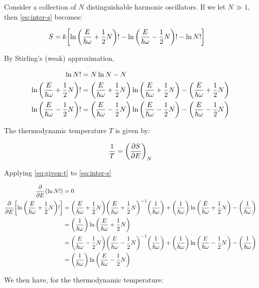 \documentclass[12pt,a4paper]{article}
\begin{document}
Consider a collection of $N$ distinguishable harmonic oscillators. If we let $N \gg 1$, then \eqref{eq:inter-s} becomes:

\begin{align}
	S &= k\qty[\ln\qty(\frac{E}{\hbar\omega} + \frac{1}{2}N)!-\ln\qty(\frac{E}{\hbar\omega} - \frac{1}{2}N)! - \ln N!]
\end{align}

By Stirling's (weak) approximation,

\begin{align}
    \ln N! &= N\ln N - N\\
    \ln\qty(\frac{E}{\hbar\omega} + \frac{1}{2}N)! &= \qty(\frac{E}{\hbar\omega} + \frac{1}{2}N)\ln\qty(\frac{E}{\hbar\omega} + \frac{1}{2}N) - \qty(\frac{E}{\hbar\omega} + \frac{1}{2}N) \\
    \ln\qty(\frac{E}{\hbar\omega} - \frac{1}{2}N)! &= \qty(\frac{E}{\hbar\omega} - \frac{1}{2}N)\ln\qty(\frac{E}{\hbar\omega} - \frac{1}{2}N) - \qty(\frac{E}{\hbar\omega} - \frac{1}{2}N)
\end{align}

The thermodynamic temperature $T$ is given by:

\begin{equation}
    \frac{1}{T} = \qty(\pdv{S}{E})_{N} \label{eq:given-t}
\end{equation}

Applying \eqref{eq:given-t} to \eqref{eq:inter-s}

\begin{align}
    \pdv{E}(\ln N!) &= 0 \\
    \pdv{E}\qty[\ln\qty(\frac{E}{\hbar\omega} + \frac{1}{2}N)!] &= \qty(\frac{E}{\hbar\omega} + \frac{1}{2}N)\qty(\frac{E}{\hbar\omega} + \frac{1}{2}N)^{-1}\qty(\frac{1}{\hbar\omega})+ \qty(\frac{1}{\hbar\omega})\ln\qty(\frac{E}{\hbar\omega} + \frac{1}{2}N)-\qty(\frac{1}{\hbar\omega}) \\
    &=  \qty(\frac{1}{\hbar\omega})\ln\qty(\frac{E}{\hbar\omega} + \frac{1}{2}N) \\
    &= \qty(\frac{E}{\hbar\omega} - \frac{1}{2}N)\qty(\frac{E}{\hbar\omega} - \frac{1}{2}N)^{-1}\qty(\frac{1}{\hbar\omega})+ \qty(\frac{1}{\hbar\omega})\ln\qty(\frac{E}{\hbar\omega} - \frac{1}{2}N)-\qty(\frac{1}{\hbar\omega}) \\
    &=  \qty(\frac{1}{\hbar\omega})\ln\qty(\frac{E}{\hbar\omega} - \frac{1}{2}N)
\end{align}

We then have, for the thermodynamic temperature:
\end{document}

